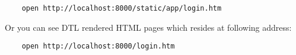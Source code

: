 \vspace{1\baselineskip}
\begin{lstlisting}
    open http://localhost:8000/static/app/login.htm
\end{lstlisting}
\vspace{1\baselineskip}

Or you can see DTL rendered HTML pages which resides at following address:

\vspace{1\baselineskip}
\begin{lstlisting}
    open http://localhost:8000/login.htm
\end{lstlisting}
\vspace{1\baselineskip}

